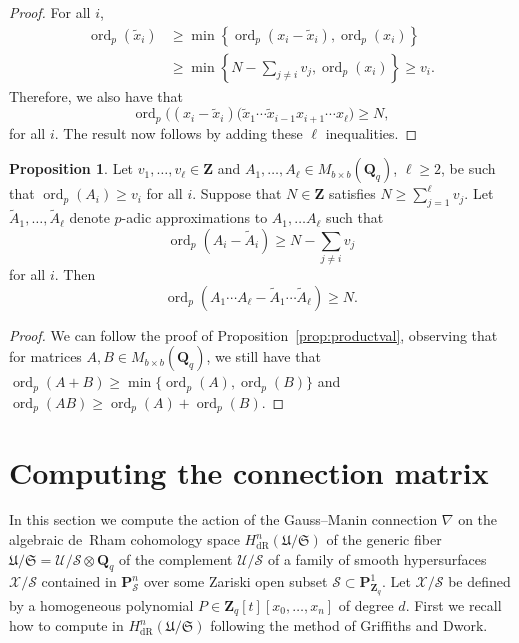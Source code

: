 \documentclass[a4paper,11pt]{article}
\numberwithin{equation}{section}
\newcommand{\ZZ}{\mathbf{Z}} %
\newcommand{\QQ}{\mathbf{Q}} %
\DeclareMathOperator{\ord}{ord}          %
\providecommand{\HdR}{H_{\text{dR}}}    %
\theoremstyle{definition}
\newtheorem{prop}[thm]{Proposition}
\begin{document}
\begin{proof}
For all $i$,
\begin{align*}
\ord_p\left(\tilde{x}_i \right) &\geq \min \left\{ \ord_p\left(x_i-\tilde{x}_i\right), \ord_p(x_i) \right\} \\
                    &\geq \min \left\{ N- \sum_{j \neq i} v_j, \ord_p(x_i)\right\} \geq v_i.
\end{align*}
Therefore, we also have that
\begin{equation*}
\ord_p \bigl( (x_{i}-\tilde{x}_{i})
    (\tilde{x}_1 \dotsm \tilde{x}_{i-1} x_{i+1} \dotsm x_{\ell} \bigr) \geq N,
\end{equation*}
for all $i$. The result now follows by adding these $\ell$ inequalities.
\end{proof}

\begin{prop} \label{prop:matrixproductval}
Let $v_1,\dotsc,v_{\ell} \in \ZZ$ and 
$A_1, \dotsc, A_{\ell} \in M_{b \times b}(\QQ_q)$, $\ell \geq 2$, be 
such that $\ord_p(A_i) \geq v_i$ for all $i$. Suppose that $N \in \ZZ$ 
satisfies $N \geq \sum_{j=1}^{\ell} v_j$. 
Let $\tilde{A}_1, \dotsc, \tilde{A}_{\ell}$ denote $p$-adic approximations 
to $A_1, \dotsc A_{\ell}$ such that
\[
\ord_p\left(A_i - \tilde{A}_i\right) \geq N - \sum_{j \neq i} v_j
\]
for all $i$.  Then 
\begin{equation}
\ord_p\left(A_1 \dotsm A_{\ell} - \tilde{A}_1 \dotsm \tilde{A}_{\ell}\right) \geq N.
\end{equation}
\end{prop}

\begin{proof}
We can follow the proof of Proposition~\ref{prop:productval}, 
observing that for matrices $A,B \in M_{b \times b}(\QQ_q)$, we still 
have that $\ord_p(A + B) \geq \min \{\ord_p(A), \ord_p(B)\}$ and 
$\ord_p(AB) \geq \ord_p(A)+\ord_p(B)$.
\end{proof}

\section{Computing the connection matrix}
\label{sec:Connection}

In this section we compute the action of the Gauss--Manin connection $\nabla$ 
on the algebraic de~Rham cohomology space $\HdR^{n}(\mathfrak{U}/\mathfrak{S})$ 
of the generic fiber 
$\mathfrak{U}/\mathfrak{S}=\mathcal{U}/\mathcal{S} \otimes \QQ_q$ of the 
complement $\mathcal{U}/\mathcal{S}$ of a family of smooth hypersurfaces 
$\mathcal{X}/\mathcal{S}$ contained in $\mathbf{P}^n_{\mathcal{S}}$ over
some Zariski open subset $\mathcal{S} \subset \mathbf{P}^1_{\ZZ_q}$. Let 
$\mathcal{X}/\mathcal{S}$ be defined by a homogeneous polynomial 
$P \in \ZZ_q[t][x_0,\dotsc,x_n]$ of degree $d$. First we recall how to 
compute in $\HdR^{n}(\mathfrak{U}/\mathfrak{S})$ following the method 
of Griffiths and Dwork.  
\end{document}

